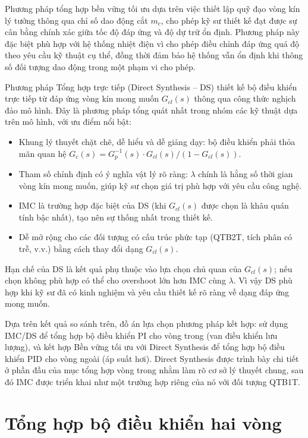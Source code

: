\documentclass[../main.tex]{subfiles}
\begin{document}
Phương pháp tổng hợp bền vững tối ưu dựa trên việc thiết lập quỹ đạo vòng kín lý tưởng thông qua chỉ số dao động cắt $m_c$, cho phép kỹ sư thiết kế đạt được sự cân bằng chính xác giữa tốc độ đáp ứng và độ dự trữ ổn định. Phương pháp này đặc biệt phù hợp với hệ thống nhiệt điện vì cho phép điều chỉnh đáp ứng quá độ theo yêu cầu kỹ thuật cụ thể, đồng thời đảm bảo hệ thống vẫn ổn định khi thông số đối tượng dao động trong một phạm vi cho phép.

Phương pháp Tổng hợp trực tiếp (Direct Synthesis -- DS) thiết kế bộ điều khiển trực tiếp từ đáp ứng vòng kín mong muốn $G_{cl}(s)$ thông qua công thức nghịch đảo mô hình. Đây là phương pháp tổng quát nhất trong nhóm các kỹ thuật dựa trên mô hình, với ưu điểm nổi bật:
\begin{itemize}
    \item Khung lý thuyết chặt chẽ, dễ hiểu và dễ giảng dạy: bộ điều khiển phải thỏa mãn quan hệ $G_c(s) = G_p^{-1}(s) \cdot G_{cl}(s) / (1 - G_{cl}(s))$.
    \item Tham số chỉnh định có ý nghĩa vật lý rõ ràng: $\lambda$ chính là hằng số thời gian vòng kín mong muốn, giúp kỹ sư chọn giá trị phù hợp với yêu cầu công nghệ.
    \item IMC là trường hợp đặc biệt của DS (khi $G_{cl}(s)$ được chọn là khâu quán tính bậc nhất), tạo nên sự thống nhất trong thiết kế.
    \item Dễ mở rộng cho các đối tượng có cấu trúc phức tạp (QTB2T, tích phân có trễ, v.v.) bằng cách thay đổi dạng $G_{cl}(s)$.
\end{itemize}
Hạn chế của DS là kết quả phụ thuộc vào lựa chọn chủ quan của $G_{cl}(s)$; nếu chọn không phù hợp có thể cho overshoot lớn hơn IMC cùng $\lambda$. Vì vậy DS phù hợp khi kỹ sư đã có kinh nghiệm và yêu cầu thiết kế rõ ràng về dạng đáp ứng mong muốn.

Dựa trên kết quả so sánh trên, đồ án lựa chọn phương pháp kết hợp: sử dụng IMC/DS để tổng hợp bộ điều khiển PI cho vòng trong (van điều khiển lưu lượng), và kết hợp Bền vững tối ưu với Direct Synthesis để tổng hợp bộ điều khiển PID cho vòng ngoài (áp suất hơi). Direct Synthesis được trình bày chi tiết ở phần đầu của mục tổng hợp vòng trong nhằm làm rõ cơ sở lý thuyết chung, sau đó IMC được triển khai như một trường hợp riêng của nó với đối tượng QTB1T.

\section{Tổng hợp bộ điều khiển hai vòng}
\end{document}
